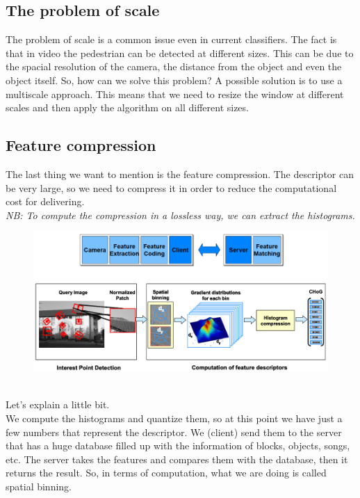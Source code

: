 \subsection{The problem of scale}
The problem of scale is a common issue even in current classifiers. The fact is that in video the pedestrian can be detected at different sizes.
This can be due to the spacial resolution of the camera, the distance from the object and even the object itself.
So, how can we solve this problem? A possible solution is to use a multiscale approach. This means that we need to resize the window at different scales and then apply the algorithm on all different sizes.
\subsection{Feature compression}
The last thing we want to mention is the feature compression. The descriptor can be very large, so we need to compress it in order to reduce the computational cost for delivering.
\\\textit{NB: To compute the compression in a lossless way, we can extract the histograms.}
\begin{figure}[h]
    \centering
    \includegraphics[scale=0.5]{Figures/FeatureCompression.png}
\end{figure}
\\Let's explain a little bit.
\\We compute the histograms and quantize them, so at this point we have just a few numbers that represent the descriptor. 
We (client) send them to the server that has a huge database filled up with the information of blocks, objects, songs, etc.
The server takes the features and compares them with the database, then it returns the result.
So, in terms of computation, what we are doing is called spatial binning.


